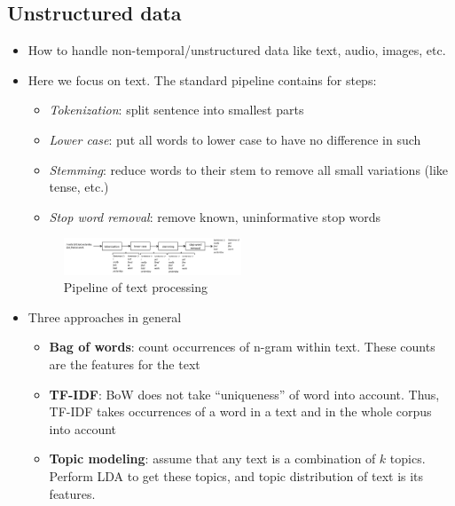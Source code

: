 \subsection{Unstructured data}
\begin{itemize}
	\item How to handle non-temporal/unstructured data like text, audio, images, etc.
	\item Here we focus on text. The standard pipeline contains for steps:
	\begin{itemize}
		\item \textit{Tokenization}: split sentence into smallest parts 
		\item \textit{Lower case}: put all words to lower case to have no difference in such
		\item \textit{Stemming}: reduce words to their stem to remove all small variations (like tense, etc.)
		\item \textit{Stop word removal}: remove known, uninformative stop words 
	\end{itemize}
	\begin{figure}[ht!]
		\centering
		\includegraphics[width=0.5\textwidth]{figures/chapter_4_text_pipeline.png}
		\caption{Pipeline of text processing}
	\end{figure}
	\item Three approaches in general
	\begin{itemize}
		\item \textbf{Bag of words}: count occurrences of n-gram within text. These counts are the features for the text
		\item \textbf{TF-IDF}: BoW does not take ``uniqueness'' of word into account. Thus, TF-IDF takes occurrences of a word in a text and in the whole corpus into account
		\item \textbf{Topic modeling}: assume that any text is a combination of $k$ topics. Perform LDA to get these topics, and topic distribution of text is its features.
	\end{itemize}
\end{itemize}